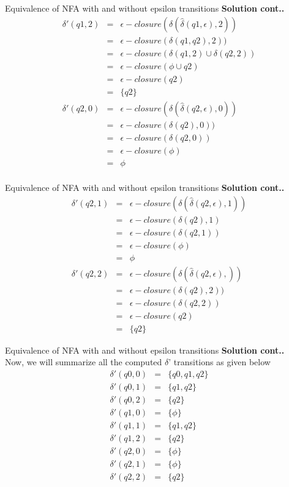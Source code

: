 \documentclass{beamer}
\begin{document}
\begin{frame}{Equivalence of NFA with and without epsilon transitions}
	\textbf{Solution cont..}
	\begin{eqnarray*}
	\delta'(q1, 2) &=& \epsilon-closure(\delta(\hat{\delta}(q1, \epsilon),2))\\
	&=& \epsilon-closure(\delta(q1,q2), 2))\\
	&=& \epsilon-closure(\delta(q1, 2) \cup \delta(q2, 2) )\\
	&=& \epsilon-closure(\phi \cup q2)\\
	&=& \epsilon-closure(q2)\\
	&=& \{q2\}\\
	\delta'(q2, 0) &=& \epsilon-closure(\delta(\hat{\delta}(q2, \epsilon),0))\\
	&=& \epsilon-closure(\delta(q2), 0))\\
	&=& \epsilon-closure(\delta(q2, 0))\\
	&=& \epsilon-closure(\phi)\\
	&=& \phi\\
	\end{eqnarray*}
\end{frame}
\begin{frame}{Equivalence of NFA with and without epsilon transitions}
	\textbf{Solution cont..}
	\begin{eqnarray*}
		\delta'(q2, 1) &=& \epsilon-closure(\delta(\hat{\delta}(q2, \epsilon),1))\\
		&=& \epsilon-closure(\delta(q2), 1)\\
		&=& \epsilon-closure(\delta(q2, 1))\\
		&=& \epsilon-closure(\phi)\\
		&=& \phi\\
		\delta'(q2, 2) &=& \epsilon-closure(\delta(\hat{\delta}(q2, \epsilon),))\\
		&=& \epsilon-closure(\delta(q2), 2))\\
		&=& \epsilon-closure(\delta(q2, 2))\\
		&=& \epsilon-closure(q2)\\
		&=& \{q2\}
	\end{eqnarray*}
\end{frame}
\begin{frame}{Equivalence of NFA with and without epsilon transitions}
	\textbf{Solution cont..}\\Now, we will summarize all the computed $\delta$' transitions as given below
	\begin{eqnarray*}
		\delta'(q0,0)&=&\{q0,q1,q2\}\\
		\delta'(q0,1)&=&\{q1,q2\}\\
		\delta'(q0,2)&=&\{q2\}\\
		\delta'(q1,0)&=&\{ \phi \}\\
		\delta'(q1,1)&=&\{q1,q2\}\\
		\delta'(q1,2)&=&\{q2\}\\
		\delta'(q2,0)&=&\{ \phi \}\\
		\delta'(q2,1)&=&\{ \phi \}\\
		\delta'(q2,2)&=&\{q2\}\\
	\end{eqnarray*}
\end{frame}
\end{document}
